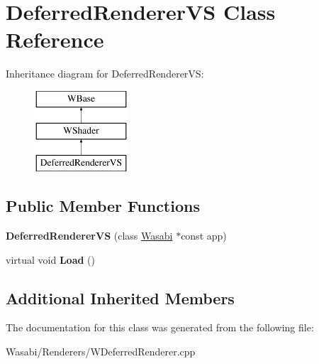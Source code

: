 \hypertarget{class_deferred_renderer_v_s}{}\section{Deferred\+Renderer\+VS Class Reference}
\label{class_deferred_renderer_v_s}
Inheritance diagram for Deferred\+Renderer\+VS\+:\begin{figure}[H]
\begin{center}
\leavevmode
\includegraphics[height=3.000000cm]{class_deferred_renderer_v_s}
\end{center}
\end{figure}
\subsection*{Public Member Functions}
\begin{DoxyCompactItemize}
\item 
{\bfseries Deferred\+Renderer\+VS} (class \hyperlink{class_wasabi}{Wasabi} $\ast$const app)\hypertarget{class_deferred_renderer_v_s_a976a0e5a596f742cb7a64f91eee3f833}{}\label{class_deferred_renderer_v_s_a976a0e5a596f742cb7a64f91eee3f833}

\item 
virtual void {\bfseries Load} ()\hypertarget{class_deferred_renderer_v_s_a35e479b4de6f046fa3b45e147eab3acf}{}\label{class_deferred_renderer_v_s_a35e479b4de6f046fa3b45e147eab3acf}

\end{DoxyCompactItemize}
\subsection*{Additional Inherited Members}


The documentation for this class was generated from the following file\+:\begin{DoxyCompactItemize}
\item 
Wasabi/\+Renderers/W\+Deferred\+Renderer.\+cpp\end{DoxyCompactItemize}
